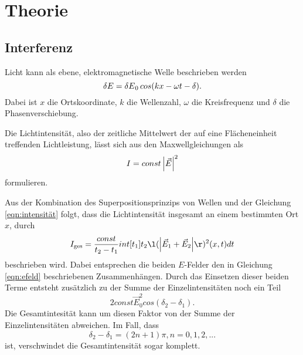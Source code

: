 \section{Theorie}
\label{sec:Theorie}

\subsection{Interferenz}
Licht kann als ebene, elektromagnetische Welle beschrieben werden
\begin{equation*}
    \var{E}= \var{E}_0 cos(kx - \omega t - \delta).
    \label{eqn:efeld}
\end{equation*}
Dabei ist $x$ die Ortskoordinate, $k$ die Wellenzahl, $\omega$ die Kreisfrequenz und $\delta$ 
die Phasenverschiebung. 


\noindent Die Lichtintensität, also der zeitliche Mittelwert der auf eine Flächeneinheit 
treffenden Lichtleistung, lässt sich aus den Maxwellgleichungen als
\begin{equation}
    I = const \, \abs{\vec{E}}^{2}
    \label{eqn:intensität}
\end{equation} 
formulieren.

\noindent Aus der Kombination des Superpositionsprinzips von Wellen und der Gleichung 
\ref{eqn:intensität} folgt, dass die Lichtintensität insgesamt an einem bestimmten Ort 
$x$, durch
\begin{equation}
    I_\text{ges}= \frac{const}{t_2-t_1} int[t_1]{t_2} \l(\abs{\vec{E}_1 + \vec{E}_2} \r)^2 (x, t) dt
    \label{eqn:iges}
\end{equation}
beschrieben wird. Dabei entsprechen die beiden $E$-Felder den in Gleichung \ref{eqn:efeld} 
beschriebenen Zusammenhängen. 
Durch das Einsetzen dieser beiden Terme entsteht zusätzlich zu der Summe der 
Einzelintensitäten noch ein Teil 
\begin{equation}
    2 const \vec{E}_{0}^2 cos(\delta_2 - \delta_1).
    \label{eqn:zusatz}
\end{equation}
Die Gesamtintesität kann um diesen Faktor von der Summe der Einzelintensitäten 
abweichen. Im Fall, dass 
\begin{equation}
    \delta_2 - \delta_1 = (2n +1) \pi , n= 0, 1, 2, ...
\end{equation}
ist, verschwindet die Gesamtintensität sogar komplett. 

